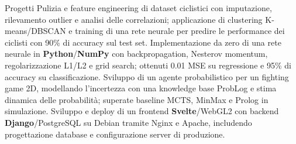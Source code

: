 \begin{rubric}{Progetti}
%
%
\entry* Pulizia e feature engineering di dataset ciclistici con imputazione, rilevamento outlier e analisi delle correlazioni; applicazione di clustering K-means/DBSCAN e training di una rete neurale per predire le performance dei ciclisti con 90\% di accuracy sul test set.
% 
%
\entry* Implementazione da zero di una rete neurale in \textbf{Python}/\textbf{NumPy} con backpropagation, Nesterov momentum, regolarizzazione L1/L2 e grid search; ottenuti 0.01 MSE su regressione e 95\% di accuracy su classificazione.
%
\entry* Sviluppo di un agente probabilistico per un fighting game 2D, modellando l'incertezza con una knowledge base ProbLog e stima dinamica delle probabilit\`a; superate baseline MCTS, MinMax e Prolog in simulazione.
%
\entry* Sviluppo e deploy di un frontend \textbf{Svelte}/WebGL2 con backend \textbf{Django}/PostgreSQL su Debian tramite Nginx e Apache, includendo progettazione database e configurazione server di produzione.
%
\end{rubric}
